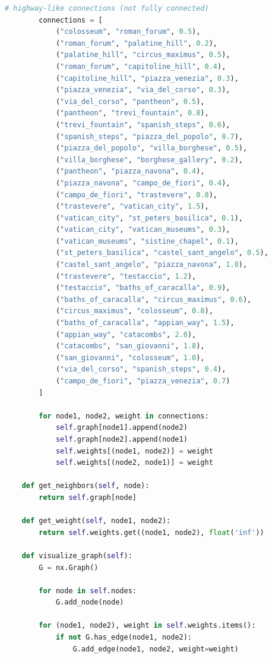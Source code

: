 \documentclass{article}
\begin{document}
\begin{lstlisting}[language=Python, caption={Rome City Path Finding}]
        # highway-like connections (not fully connected)
        connections = [
            ("colosseum", "roman_forum", 0.5),
            ("roman_forum", "palatine_hill", 0.2),
            ("palatine_hill", "circus_maximus", 0.5),
            ("roman_forum", "capitoline_hill", 0.4),
            ("capitoline_hill", "piazza_venezia", 0.3),
            ("piazza_venezia", "via_del_corso", 0.3),
            ("via_del_corso", "pantheon", 0.5),
            ("pantheon", "trevi_fountain", 0.8),
            ("trevi_fountain", "spanish_steps", 0.6),
            ("spanish_steps", "piazza_del_popolo", 0.7),
            ("piazza_del_popolo", "villa_borghese", 0.5),
            ("villa_borghese", "borghese_gallery", 0.2),
            ("pantheon", "piazza_navona", 0.4),
            ("piazza_navona", "campo_de_fiori", 0.4),
            ("campo_de_fiori", "trastevere", 0.8),
            ("trastevere", "vatican_city", 1.5),
            ("vatican_city", "st_peters_basilica", 0.1),
            ("vatican_city", "vatican_museums", 0.3),
            ("vatican_museums", "sistine_chapel", 0.1),
            ("st_peters_basilica", "castel_sant_angelo", 0.5),
            ("castel_sant_angelo", "piazza_navona", 1.0),
            ("trastevere", "testaccio", 1.2),
            ("testaccio", "baths_of_caracalla", 0.9),
            ("baths_of_caracalla", "circus_maximus", 0.6),
            ("circus_maximus", "colosseum", 0.8),
            ("baths_of_caracalla", "appian_way", 1.5),
            ("appian_way", "catacombs", 2.0),
            ("catacombs", "san_giovanni", 1.8),
            ("san_giovanni", "colosseum", 1.0),
            ("via_del_corso", "spanish_steps", 0.4),
            ("campo_de_fiori", "piazza_venezia", 0.7)
        ]
        
        for node1, node2, weight in connections:
            self.graph[node1].append(node2)
            self.graph[node2].append(node1)
            self.weights[(node1, node2)] = weight
            self.weights[(node2, node1)] = weight
    
    def get_neighbors(self, node):
        return self.graph[node]
    
    def get_weight(self, node1, node2):
        return self.weights.get((node1, node2), float('inf'))
    
    def visualize_graph(self):
        G = nx.Graph()
        
        for node in self.nodes:
            G.add_node(node)
        
        for (node1, node2), weight in self.weights.items():
            if not G.has_edge(node1, node2):
                G.add_edge(node1, node2, weight=weight)
        

\end{lstlisting}
\end{document}
